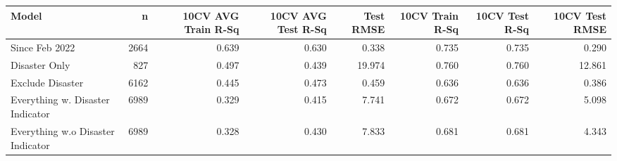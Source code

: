 
\begin{tabular}{l|r|r|r|r|r|r|r}
\hline
Model & n & 10CV AVG Train R-Sq & 10CV AVG Test R-Sq & Test RMSE & 10CV Train R-Sq & 10CV Test R-Sq & 10CV Test RMSE\\
\hline
Since Feb 2022 & 2664 & 0.639 & 0.630 & 0.338 & 0.735 & 0.735 & 0.290\\
\hline
Disaster Only & 827 & 0.497 & 0.439 & 19.974 & 0.760 & 0.760 & 12.861\\
\hline
Exclude Disaster & 6162 & 0.445 & 0.473 & 0.459 & 0.636 & 0.636 & 0.386\\
\hline
Everything w. Disaster Indicator & 6989 & 0.329 & 0.415 & 7.741 & 0.672 & 0.672 & 5.098\\
\hline
Everything w.o Disaster Indicator & 6989 & 0.328 & 0.430 & 7.833 & 0.681 & 0.681 & 4.343\\
\hline
\end{tabular}
